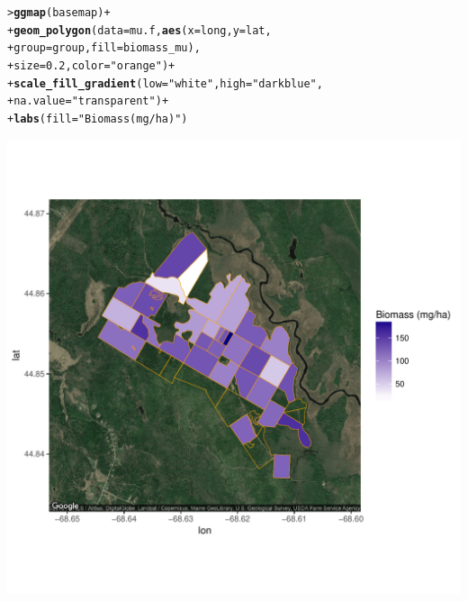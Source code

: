 \documentclass[12pt,oneside]{book}\usepackage[]{graphicx}\usepackage[]{color}
\makeatletter
\def\maxwidth{ %
  \ifdim\Gin@nat@width>\linewidth
    \linewidth
  \else
    \Gin@nat@width
  \fi
}
\newcommand{\hlnum}[1]{\textcolor[rgb]{0.686,0.059,0.569}{#1}}%
\newcommand{\hlstr}[1]{\textcolor[rgb]{0.192,0.494,0.8}{#1}}%
\newcommand{\hlopt}[1]{\textcolor[rgb]{0,0,0}{#1}}%
\newcommand{\hlstd}[1]{\textcolor[rgb]{0.345,0.345,0.345}{#1}}%
\newcommand{\hlkwc}[1]{\textcolor[rgb]{0.333,0.667,0.333}{#1}}%
\newcommand{\hlkwd}[1]{\textcolor[rgb]{0.737,0.353,0.396}{\textbf{#1}}}%
\newenvironment{kframe}{%
 \def\at@end@of@kframe{}%
 \ifinner\ifhmode%
  \def\at@end@of@kframe{\end{minipage}}%
  \begin{minipage}{\columnwidth}%
 \fi\fi%
 \def\FrameCommand##1{\hskip\@totalleftmargin \hskip-\fboxsep
 \colorbox{shadecolor}{##1}\hskip-\fboxsep
     \hskip-\linewidth \hskip-\@totalleftmargin \hskip\columnwidth}%
 \MakeFramed {\advance\hsize-\width
   \@totalleftmargin\z@ \linewidth\hsize
   \@setminipage}}%
 {\par\unskip\endMakeFramed%
 \at@end@of@kframe}
\newenvironment{knitrout}{}{} %
\makeatother
\begin{document}
\begin{knitrout}
\color{fgcolor}\begin{kframe}
\begin{alltt}
\hlstd{> }\hlkwd{ggmap}\hlstd{(basemap)} \hlopt{+}
\hlstd{+ }    \hlkwd{geom_polygon}\hlstd{(}\hlkwc{data}\hlstd{=mu.f,} \hlkwd{aes}\hlstd{(}\hlkwc{x} \hlstd{= long,} \hlkwc{y} \hlstd{= lat,}
\hlstd{+ }                                \hlkwc{group}\hlstd{=group,} \hlkwc{fill}\hlstd{=biomass_mu),}
\hlstd{+ }                 \hlkwc{size}\hlstd{=}\hlnum{0.2}\hlstd{,} \hlkwc{color}\hlstd{=}\hlstr{"orange"}\hlstd{)} \hlopt{+}
\hlstd{+ }    \hlkwd{scale_fill_gradient}\hlstd{(}\hlkwc{low}\hlstd{=}\hlstr{"white"}\hlstd{,} \hlkwc{high}\hlstd{=}\hlstr{"darkblue"}\hlstd{,}
\hlstd{+ }                        \hlkwc{na.value}\hlstd{=}\hlstr{"transparent"}\hlstd{)} \hlopt{+}
\hlstd{+ }    \hlkwd{labs}\hlstd{(}\hlkwc{fill}\hlstd{=}\hlstr{"Biomass (mg/ha)"}\hlstd{)}
\end{alltt}
\end{kframe}
\includegraphics[width=\maxwidth]{figure/unnamed-chunk-195-1} 

\end{knitrout}
\end{document}
